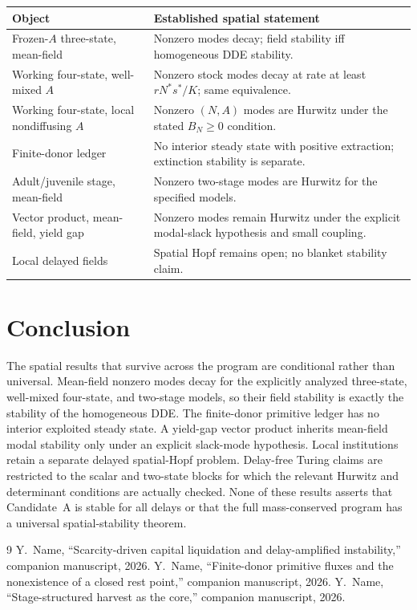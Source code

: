 \documentclass[11pt]{article}
\theoremstyle{definition}
\begin{document}
\begin{center}
\begin{tabular}{@{}p{4.4cm}p{9.8cm}@{}}
\toprule
Object & Established spatial statement \\
\midrule
Frozen-$A$ three-state, mean-field & Nonzero modes decay; field stability iff homogeneous DDE stability. \\
Working four-state, well-mixed $A$ & Nonzero stock modes decay at rate at least $rN^*s^*/K$; same equivalence. \\
Working four-state, local nondiffusing $A$ & Nonzero $(N,A)$ modes are Hurwitz under the stated $B_N\ge0$ condition. \\
Finite-donor ledger & No interior steady state with positive extraction; extinction stability is separate. \\
Adult/juvenile stage, mean-field & Nonzero two-stage modes are Hurwitz for the specified models. \\
Vector product, mean-field, yield gap & Nonzero modes remain Hurwitz under the explicit modal-slack hypothesis and small coupling. \\
Local delayed fields & Spatial Hopf remains open; no blanket stability claim. \\
\bottomrule
\end{tabular}
\end{center}

\section{Conclusion}

The spatial results that survive across the program are conditional rather than universal. Mean-field nonzero modes decay for the explicitly analyzed three-state, well-mixed four-state, and two-stage models, so their field stability is exactly the stability of the homogeneous DDE. The finite-donor primitive ledger has no interior exploited steady state. A yield-gap vector product inherits mean-field modal stability only under an explicit slack-mode hypothesis. Local institutions retain a separate delayed spatial-Hopf problem. Delay-free Turing claims are restricted to the scalar and two-state blocks for which the relevant Hurwitz and determinant conditions are actually checked. None of these results asserts that Candidate~A is stable for all delays or that the full mass-conserved program has a universal spatial-stability theorem.

\begin{thebibliography}{9}
 Y.~Name, ``Scarcity-driven capital liquidation and delay-amplified instability,'' companion manuscript, 2026.
 Y.~Name, ``Finite-donor primitive fluxes and the nonexistence of a closed rest point,'' companion manuscript, 2026.
 Y.~Name, ``Stage-structured harvest as the core,'' companion manuscript, 2026.
\end{thebibliography}
\end{document}
